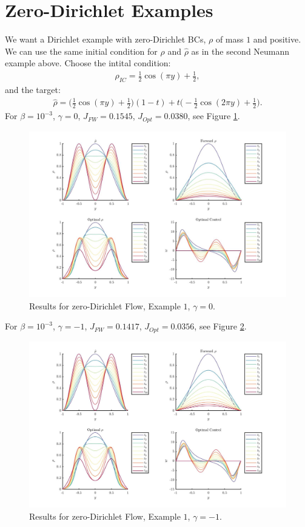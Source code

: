 \documentclass[11pt, a4paper]{article}
\theoremstyle{definition}
\begin{document}
\section{Zero-Dirichlet Examples}
We want a Dirichlet example with zero-Dirichlet BCs, $\rho$ of mass $1$ and positive. We can use the same initial condition for $\rho$ and $\hat \rho$ as in the second Neumann example above.
Choose the intital condition:
\begin{align*}
\rho_{IC} = \frac{1}{2}\cos(\pi y) + \frac{1}{2},
\end{align*}
and the target:
\begin{align*}
\hat \rho = \bigg(\frac{1}{2}\cos(\pi y) + \frac{1}{2}\bigg)(1-t) + t\bigg(-\frac{1}{2}\cos(2 \pi y) + \frac{1}{2}\bigg).
\end{align*}
For $\beta = 10^{-3}$, $\gamma = 0$, $J_{FW} = 0.1545$, $J_{Opt} = 0.0380$, see Figure \ref{ResD01}.
\begin{figure}[h]
	\includegraphics[scale=0.3]{ResD01.jpg}
	\caption{Results for zero-Dirichlet Flow, Example $1$, $\gamma = 0$.}
	\label{ResD01}
\end{figure}
For $\beta = 10^{-3}$, $\gamma = -1$, $J_{FW} = 0.1417$, $J_{Opt} = 0.0356$, see Figure \ref{ResD01a}.
\begin{figure}[h]
	\includegraphics[scale=0.3]{ResD01a.jpg}
	\caption{Results for zero-Dirichlet Flow, Example $1$, $\gamma = -1$.}
	\label{ResD01a}
\end{figure}
\end{document}
